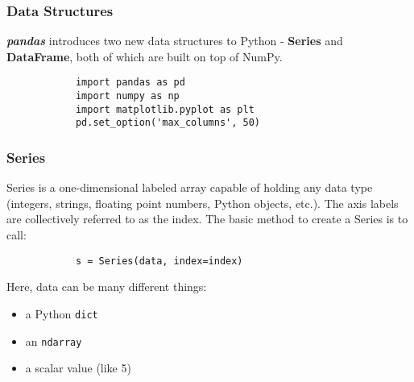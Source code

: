 \documentclass[MASTER.tex]{subfiles}
\begin{document}
 
	
	
	
	\begin{frame}[fragile]
	\frametitle{Data Structures}	
		\textbf{\textit{pandas}} introduces two new data structures to Python - \textbf{Series} and \textbf{DataFrame}, both of which are built on top of NumPy.
		
		\begin{framed}
			\begin{verbatim}
			import pandas as pd
			import numpy as np
			import matplotlib.pyplot as plt
			pd.set_option('max_columns', 50)
			\end{verbatim}
		\end{framed}
		
	\end{frame}
	\begin{frame}[fragile]
		\frametitle{Series}
		
		Series is a one-dimensional labeled array capable of holding any data type (integers, strings, floating point numbers, Python objects, etc.). The axis labels are collectively referred to as the index. The basic method to create a Series is to call:
		
		\begin{framed}
			\begin{verbatim}
			s = Series(data, index=index)
			\end{verbatim}
		\end{framed} 
		Here, data can be many different things:
		
		\begin{itemize}
			\item a Python \texttt{dict}
			\item an \texttt{ndarray}
			\item a scalar value (like 5)
		\end{itemize}
		
	\end{frame}
\end{document}
